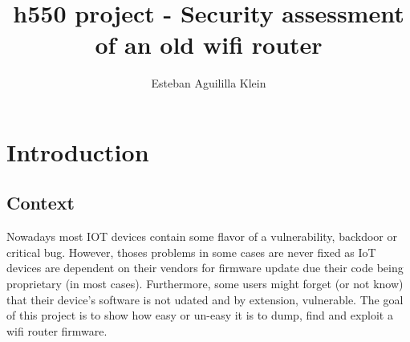 \documentclass{article}
\title{h550 project - Security assessment of an old wifi router}
\author{Esteban Aguililla Klein}
\begin{document}
\maketitle	
\newpage
\tableofcontents
\newpage
\section{Introduction}
\subsection{Context}
Nowadays most IOT devices contain some flavor of a vulnerability, backdoor or critical bug. However, thoses problems in some cases are never fixed as IoT devices are dependent on their vendors for firmware update due their code being proprietary (in most cases). Furthermore, some users might forget (or not know) that their device's software is not udated and by extension, vulnerable. The goal of this project is to show how easy or un-easy it is to dump, find and exploit a wifi router firmware.
\end{document}
